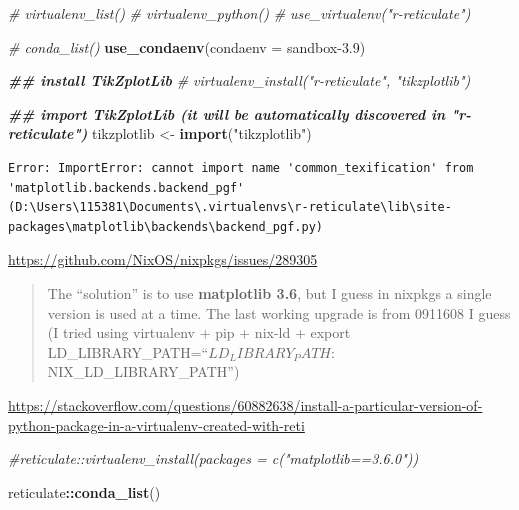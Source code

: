 \documentclass[
]{book}
\newenvironment{Shaded}{\begin{snugshade}}{\end{snugshade}}
\newcommand{\AttributeTok}[1]{\textcolor[rgb]{0.13,0.29,0.53}{#1}}
\newcommand{\CommentTok}[1]{\textcolor[rgb]{0.56,0.35,0.01}{\textit{#1}}}
\newcommand{\DocumentationTok}[1]{\textcolor[rgb]{0.56,0.35,0.01}{\textbf{\textit{#1}}}}
\newcommand{\FunctionTok}[1]{\textcolor[rgb]{0.13,0.29,0.53}{\textbf{#1}}}
\newcommand{\NormalTok}[1]{#1}
\newcommand{\OtherTok}[1]{\textcolor[rgb]{0.56,0.35,0.01}{#1}}
\newcommand{\SpecialCharTok}[1]{\textcolor[rgb]{0.81,0.36,0.00}{\textbf{#1}}}
\newcommand{\StringTok}[1]{\textcolor[rgb]{0.31,0.60,0.02}{#1}}
\theoremstyle{definition}
\theoremstyle{definition}
\theoremstyle{definition}
\theoremstyle{definition}
\theoremstyle{remark}
\begin{document}
\begin{Shaded}
\begin{Highlighting}[]
\CommentTok{\# virtualenv\_list()}
\CommentTok{\# virtualenv\_python()}
\CommentTok{\# use\_virtualenv("r{-}reticulate")}

\CommentTok{\# conda\_list()}
\FunctionTok{use\_condaenv}\NormalTok{(}\AttributeTok{condaenv =} \StringTok{\textquotesingle{}sandbox{-}3.9\textquotesingle{}}\NormalTok{)}

\DocumentationTok{\#\# install TikZplotLib}
\CommentTok{\# virtualenv\_install("r{-}reticulate", "tikzplotlib")}

\DocumentationTok{\#\# import TikZplotLib (it will be automatically discovered in "r{-}reticulate")}
\NormalTok{tikzplotlib }\OtherTok{\textless{}{-}} \FunctionTok{import}\NormalTok{(}\StringTok{"tikzplotlib"}\NormalTok{)}
\end{Highlighting}
\end{Shaded}

\begin{verbatim}
Error: ImportError: cannot import name 'common_texification' from 'matplotlib.backends.backend_pgf' (D:\Users\115381\Documents\.virtualenvs\r-reticulate\lib\site-packages\matplotlib\backends\backend_pgf.py)
\end{verbatim}

\url{https://github.com/NixOS/nixpkgs/issues/289305}

\begin{quote}
The ``solution'' is to use \textbf{matplotlib 3.6}, but I guess in nixpkgs a single version is used at a time. The last working upgrade is from 0911608 I guess (I tried using virtualenv + pip + nix-ld + export LD\_LIBRARY\_PATH=``\(LD_LIBRARY_PATH:\)NIX\_LD\_LIBRARY\_PATH'')
\end{quote}

\url{https://stackoverflow.com/questions/60882638/install-a-particular-version-of-python-package-in-a-virtualenv-created-with-reti}

\begin{Shaded}
\begin{Highlighting}[]
\CommentTok{\#reticulate::virtualenv\_install(packages = c("matplotlib==3.6.0"))}
\end{Highlighting}
\end{Shaded}

\begin{Shaded}
\begin{Highlighting}[]
\NormalTok{reticulate}\SpecialCharTok{::}\FunctionTok{conda\_list}\NormalTok{()}
\end{Highlighting}
\end{Shaded}
\end{document}
